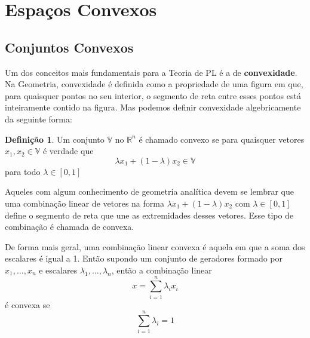 \theoremstyle{definition}

\newtheorem{def:conjunto convexo}{Definição}[chapter]

\newtheorem{def:politopo}[def:conjunto convexo]{Definição}

\newtheorem{def:poliedro convexo}[def:conjunto convexo]{Definição}

\newtheorem{def:cone}[def:conjunto convexo]{Definição}

\newtheorem{def:cone convexo}[def:conjunto convexo]{Definição}

\newtheorem{def:cpc}[def:conjunto convexo]{Definição}



\section{Espaços Convexos}

\subsection{Conjuntos Convexos}

Um dos conceitos mais fundamentais para a Teoria de PL é a de \textbf{convexidade}. Na Geometria, convexidade é definida como a propriedade de uma figura em que, para quaisquer pontos no seu interior, o segmento de reta entre esses pontos está inteiramente contido na figura. Mas podemos definir convexidade algebricamente da seguinte forma:

\begin{def:conjunto convexo}
	\label{def:conjunto convexo}
	Um conjunto $\mathbb{V}$ no $\mathbb{R}^n$ é chamado convexo se para quaisquer vetores $x_1, x_2 \in \mathbb{V}$ é verdade que \[\lambda x_1 + (1 - \lambda)x_2 \in \mathbb{V}\] para todo $\lambda \in [0, 1]$
\end{def:conjunto convexo}

Aqueles com algum conhecimento de geometria analítica devem se lembrar que uma combinação linear de vetores na forma $\lambda x_1 + (1 - \lambda)x_2$ com $\lambda \in [0, 1]$ define o segmento de reta que une as extremidades desses vetores. Esse tipo de combinação é chamada de convexa.

De forma mais geral, uma combinação linear convexa é aquela em que a soma dos escalares é igual a 1. Então supondo um conjunto de geradores formado por $x_1, \ldots, x_n$ e escalares $\lambda_1, \ldots, \lambda_n$, então a combinação linear
\[x = \sum_{i=1}^{n} \lambda_i x_i\] é convexa se \[\sum_{i=1}^{n} \lambda_i = 1\]



